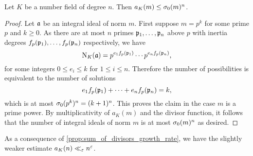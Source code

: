     \begin{proposition}\label{equ:ideals_of_fixed_norm_bound}
      Let $K$ be a number field of degree $n$. Then $a_{K}(m) \le \sigma_{0}(m)^{n}$.
    \end{proposition}
    \begin{proof}
      Let $\mathfrak{a}$ be an integral ideal of norm $m$. First suppose $m = p^{k}$ for some prime $p$ and $k \ge 0$. As there are at most $n$ primes $\mathfrak{p}_{1},\ldots,\mathfrak{p}_{n}$ above $p$ with inertia degrees $f_{p}(\mathfrak{p}_{1}),\ldots,f_{p}(\mathfrak{p}_{n})$ respectively, we have
      \[
        \operatorname{\mathrm{N}}_{K}(\mathfrak{a}) = p^{e_{1}f_{p}(\mathfrak{p}_{1})} \cdots p^{e_{n}f_{p}(\mathfrak{p}_{n})},
      \]
      for some integers $0 \le e_{i} \le k$ for $1 \le i \le n$. Therefore the number of possibilities is equivalent to the number of solutions
      \[
        e_{1}f_{p}(\mathfrak{p}_{1})+\cdots+e_{n}f_{p}(\mathfrak{p}_{n}) = k,
      \]
      which is at most $\sigma_{0}(p^{k})^{n} = (k+1)^{n}$. This proves the claim in the case $m$ is a prime power. By multiplicativity of $a_{K}(m)$ and the divisor function, it follows that the number of integral ideals of norm $m$ is at most $\sigma_{0}(m)^{n}$ as desired.
    \end{proof}

    As a consequence of \cref{prop:sum_of_divisors_growth_rate}, we have the slightly weaker estimate $a_{K}(n) \ll_{\varepsilon} n^{\varepsilon}$.